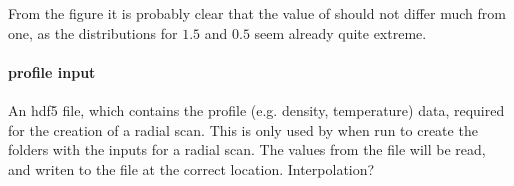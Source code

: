 From the figure it is probably clear that the value of
 should not differ much from one,
as the distributions for $1.5$ and $0.5$ seem already quite extreme.

\paragraph{profile input}
An hdf5 file, which contains the profile (e.g. density, temperature)
data, required for the creation of a radial scan.
This is only used by \neotwo when run to create the folders with the
inputs for a radial scan.
The values from the file will be read, and writen to the 
file at the correct location. Interpolation?
